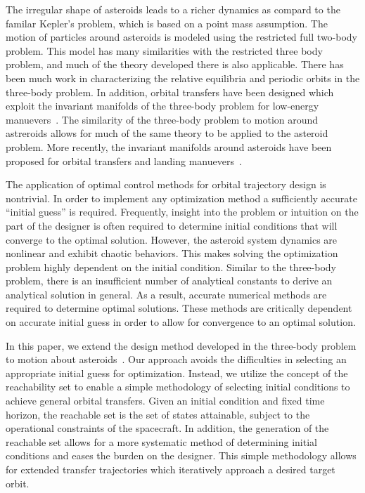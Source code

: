 \documentclass[]{aiaa-tc}%
\begin{document}
The irregular shape of asteroids leads to a richer dynamics as compard to the familar Kepler's problem, which is based on a point mass assumption.
The motion of particles around asteroids is modeled using the restricted full two-body problem.
This model has many similarities with the restricted three body problem, and much of the theory developed there is also applicable.
There has been much work in characterizing the relative equilibria and periodic orbits in the three-body problem.
In addition, orbital transfers have been designed which exploit the invariant manifolds of the three-body problem for low-energy manuevers~\cite{mingotti2011,grebow2011}.
The similarity of the three-body problem to motion around astreroids allows for much of the same theory to be applied to the asteroid problem.
More recently, the invariant manifolds around asteroids have been proposed for orbital transfers and landing manuevers~\cite{mondelo2010,herrera2014}.


The application of optimal control methods for orbital trajectory design is nontrivial.
In order to implement any optimization method a sufficiently accurate ``initial guess'' is required.
Frequently, insight into the problem or intuition on the part of the designer is often required to determine initial conditions that will converge to the optimal solution.
However, the asteroid system dynamics are nonlinear and exhibit chaotic behaviors.
This makes solving the optimization problem highly dependent on the initial condition.
Similar to the three-body problem, there is an insufficient number of analytical constants to derive an analytical solution in general.
As a result, accurate numerical methods are required to determine optimal solutions.
These methods are critically dependent on accurate initial guess in order to allow for convergence to an optimal solution.

In this paper, we extend the design method developed in the three-body problem to motion about asteroids~\cite{kulumani2015}.
Our approach avoids the difficulties in selecting an appropriate initial guess for optimization.
Instead, we utilize the concept of the reachability set to enable a simple methodology of selecting initial conditions to achieve general orbital transfers.
Given an initial condition and fixed time horizon, the reachable set is the set of states attainable, subject to the operational constraints of the spacecraft.
In addition, the generation of the reachable set allows for a more systematic method of determining initial conditions and eases the burden on the designer.
This simple methodology allows for extended transfer trajectories which iteratively approach a desired target orbit.
\end{document}
